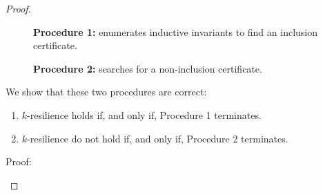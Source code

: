 \begin{proof}
\begin{figure}
	\caption{\textbf{Procedure 1:} enumerates inductive invariants to find an inclusion certificate.}\label{procedure1}
\end{figure}




\begin{figure}
	\caption{\textbf{Procedure 2:} searches for a non-inclusion certificate.}\label{procedure2}
\end{figure}

\newpage


We show that these two procedures are correct:


\begin{enumerate}

\item $k$-resilience holds if, and only if, Procedure 1 terminates.

\item $k$-resilience do not hold if, and only if, Procedure 2 terminates.

\end{enumerate}

Proof:

\begin{enumerate}


\end{enumerate}
\end{proof}
